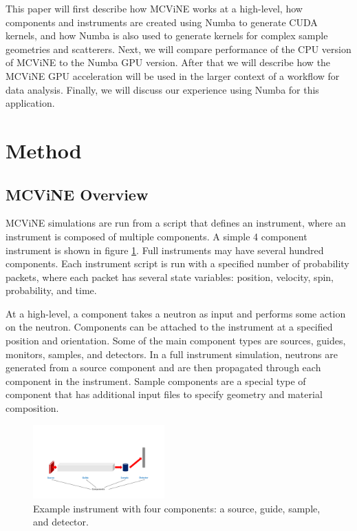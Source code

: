This paper will first describe how MCViNE works at a high-level, how components and instruments are created using Numba to generate CUDA kernels, and how Numba is also used to generate kernels for complex sample geometries and scatterers. 
Next, we will compare performance of the CPU version of MCViNE to the Numba GPU version. 
After that we will describe how the MCViNE GPU acceleration will be used in the larger context of a workflow for data analysis. 
Finally, we will discuss our experience using Numba for this application.


\section{Method}

\subsection{MCViNE Overview}

MCViNE simulations are run from a script that defines an instrument, where an instrument is composed of multiple components. A simple 4 component instrument is shown in figure \ref{fig:instrument}. Full instruments may have several hundred components. Each instrument script is run with a specified number of probability packets, where each packet has several state variables: position, velocity, spin, probability, and time.

At a high-level, a component takes a neutron as input and performs some action on the neutron. Components can be attached to the instrument at a specified position and orientation. Some of the main component types are sources, guides, monitors, samples, and detectors. In a full instrument simulation, neutrons are generated from a source component and are then propagated through each component in the instrument. Sample components are a special type of component that has additional input files to specify geometry and material composition.

\begin{figure}[H]
    \centering
    \includegraphics[width=0.45\textwidth, trim={3.5cm 1cm 3.5cm 5cm}]{figures/mcvine_acc_instrument_component_fig.pdf}
    \caption{Example instrument with four components: a source, guide, sample, and detector.}
    \label{fig:instrument}
\end{figure}


